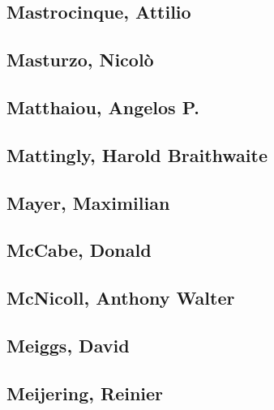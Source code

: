 \subsection[Mastrocinque, Attilio (2)]{Mastrocinque, Attilio}


\subsection[Masturzo, Nicolò (1)]{Masturzo, Nicolò}

\subsection[Matthaiou, Angelos P. (1)]{Matthaiou, Angelos P.}

\subsection[Mattingly, Harold Braithwaite (1)]{Mattingly, Harold Braithwaite}

\subsection[Mayer, Maximilian (1)]{Mayer, Maximilian}

\subsection[McCabe, Donald (1)]{McCabe, Donald}

\subsection[McNicoll, Anthony Walter (1)]{McNicoll, Anthony Walter}

\subsection[Meiggs, David (1)]{Meiggs, David}

\subsection[Meijering, Reinier (1)]{Meijering, Reinier}

